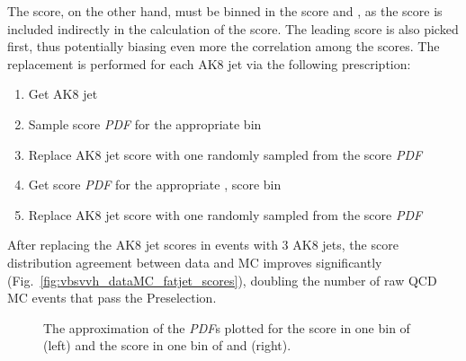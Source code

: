 The \ParticleNet \XWtoqq score, on the other hand, must be binned in the \Xtobb score and \pt, as the \Xtobb score is included indirectly in the calculation of the \XWtoqq score. 
The leading \Xtobb score is also picked first, thus potentially biasing even more the correlation among the scores.
The replacement is performed for each AK8 jet via the following prescription:
\begin{enumerate}
    \item Get AK8 jet \pt
    \item Sample \Xtobb score \textit{PDF} for the appropriate \pt bin
    \item Replace AK8 jet \Xtobb score with one randomly sampled from the \Xtobb score \textit{PDF}
    \item Get \XWtoqq score \textit{PDF} for the appropriate \pt, \Xtobb score bin
    \item Replace AK8 jet \XWtoqq score with one randomly sampled from the \XWtoqq score \textit{PDF}
\end{enumerate}

After replacing the AK8 jet scores in events with 3 AK8 jets, the \ParticleNet score distribution agreement between data and MC improves significantly (Fig.~\ref{fig:vbsvvh_dataMC_fatjet_scores}), doubling the number of raw QCD MC events that pass the Preselection.

\begin{figure}[htb]
    \centering
    \qquad
    \caption[The approximation of the \ParticleNet \textit{PDF}s]{
        The approximation of the \ParticleNet \textit{PDF}s plotted for the \Xtobb score in one bin of \pt (left) and the \XWtoqq score in one bin of \pt and \Xtobb (right). 
    }
    \label{fig:vbsvvh_pnetpdf}
\end{figure}

